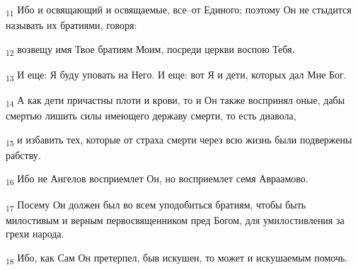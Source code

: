 \begin{tcolorbox}
\textsubscript{11} Ибо и освящающий и освящаемые, все--от Единого; поэтому Он не стыдится называть их братиями, говоря:
\end{tcolorbox}
\begin{tcolorbox}
\textsubscript{12} возвещу имя Твое братиям Моим, посреди церкви воспою Тебя.
\end{tcolorbox}
\begin{tcolorbox}
\textsubscript{13} И еще: Я буду уповать на Него. И еще: вот Я и дети, которых дал Мне Бог.
\end{tcolorbox}
\begin{tcolorbox}
\textsubscript{14} А как дети причастны плоти и крови, то и Он также воспринял оные, дабы смертью лишить силы имеющего державу смерти, то есть диавола,
\end{tcolorbox}
\begin{tcolorbox}
\textsubscript{15} и избавить тех, которые от страха смерти через всю жизнь были подвержены рабству.
\end{tcolorbox}
\begin{tcolorbox}
\textsubscript{16} Ибо не Ангелов восприемлет Он, но восприемлет семя Авраамово.
\end{tcolorbox}
\begin{tcolorbox}
\textsubscript{17} Посему Он должен был во всем уподобиться братиям, чтобы быть милостивым и верным первосвященником пред Богом, для умилостивления за грехи народа.
\end{tcolorbox}
\begin{tcolorbox}
\textsubscript{18} Ибо, как Сам Он претерпел, быв искушен, то может и искушаемым помочь.
\end{tcolorbox}
